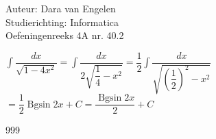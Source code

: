 \documentclass[a4paper]{article}
\begin{document}
  
\noindent \large Auteur: Dara van Engelen \\
\noindent \large Studierichting: Informatica\\
\noindent \large Oefeningenreeks 4A nr. 40.2\\

\medskip

\normalsize

$\displaystyle\int \dfrac{dx}{\sqrt{1-4x^2}} = \displaystyle\int \dfrac{dx}{2\sqrt{\dfrac{1}{4}-x^2}} = \dfrac{1}{2} \displaystyle\int \dfrac{dx}{\sqrt{\left(\dfrac{1}{2}\right)^2 - x^2}}$\\ 

$ = \dfrac{1}{2}\operatorname{Bgsin}2x +C = \dfrac{\operatorname{Bgsin}2x}{2}+C$\\

\begin{thebibliography}{999}
\end{thebibliography}
\end{document}

